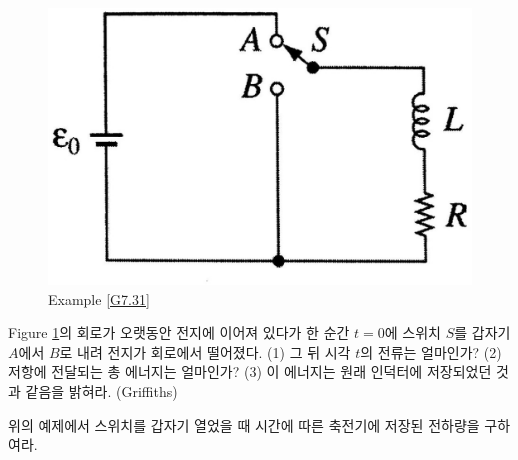 \begin{example}\label{G7.31}
\begin{figure}[h]
\centering\includegraphics[scale=0.1]{Pictures/G7.31.eps}
\caption{Example \ref{G7.31}}
\label{fig:G7.31}
\end{figure}
Figure \ref{fig:G7.31}의 회로가 오랫동안 전지에 이어져 있다가 한 순간 $t=0$에 스위치 $S$를 갑자기 $A$에서 $B$로 내려 전지가 회로에서 떨어졌다.
(1) 그 뒤 시각 $t$의 전류는 얼마인가? (2) 저항에 전달되는 총 에너지는 얼마인가? (3) 이 에너지는 원래 인덕터에 저장되었던 것과 같음을 밝혀라. (Griffiths)
\end{example}
\begin{exercise}
위의 예제에서 스위치를 갑자기 열었을 때 시간에 따른 축전기에 저장된 전하량을 구하여라.
\end{exercise}

